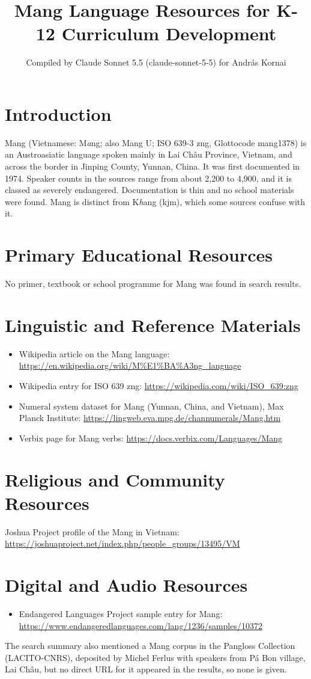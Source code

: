 \documentclass[12pt]{article}
\title{Mang Language Resources for K-12 Curriculum Development}
\author{Compiled by Claude Sonnet 5.5 (claude-sonnet-5-5) for Andr\'as Kornai}
\date{}
\begin{document}
\maketitle

\section{Introduction}
Mang (Vietnamese: M\emph{a}ng; also Mang U; ISO 639-3 zng, Glottocode mang1378) is an Austroasiatic language spoken mainly in Lai Ch\^au Province, Vietnam, and across the border in Jinping County, Yunnan, China. It was first documented in 1974. Speaker counts in the sources range from about 2,200 to 4,900, and it is classed as severely endangered. Documentation is thin and no school materials were found. Mang is distinct from K\emph{h}ang (kjm), which some sources confuse with it.

\section{Primary Educational Resources}
No primer, textbook or school programme for Mang was found in search results.

\section{Linguistic and Reference Materials}
\begin{itemize}
\item Wikipedia article on the Mang language: \url{https://en.wikipedia.org/wiki/M%E1%BA%A3ng_language}
\item Wikipedia entry for ISO 639 zng: \url{https://wikipedia.com/wiki/ISO_639:zng}
\item Numeral system dataset for Mang (Yunnan, China, and Vietnam), Max Planck Institute: \url{https://lingweb.eva.mpg.de/channumerals/Mang.htm}
\item Verbix page for Mang verbs: \url{https://docs.verbix.com/Languages/Mang}
\end{itemize}

\section{Religious and Community Resources}
Joshua Project profile of the Mang in Vietnam: \url{https://joshuaproject.net/index.php/people_groups/13495/VM}

\section{Digital and Audio Resources}
\begin{itemize}
\item Endangered Languages Project sample entry for Mang: \url{https://www.endangeredlanguages.com/lang/1236/samples/10372}
\end{itemize}
The search summary also mentioned a Mang corpus in the Pangloss Collection (LACITO-CNRS), deposited by Michel Ferlus with speakers from P\'a Bon village, Lai Ch\^au, but no direct URL for it appeared in the results, so none is given.
\end{document}
